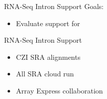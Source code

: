 \documentclass[10pt,
               hyperref={bookmarks=false,
                         bookmarksopen=false,
                         colorlinks=true,
                         linkcolor=blue,
                         urlcolor=blue},
               xcolor={svgnames,table}]{beamer}
\begin{document}
\begin{frame}{RNA-Seq Intron Support}
  Goals:
  \begin{itemize}
  \item Evaluate support for 
  \end{itemize}
\end{frame}

\begin{frame}{RNA-Seq Intron Support}
  \centering
  \begin{itemize}
  \item CZI SRA alignments
  \item All SRA cloud run
  \item Array Express collaboration
  \end{itemize}
\end{frame}
\end{document}
